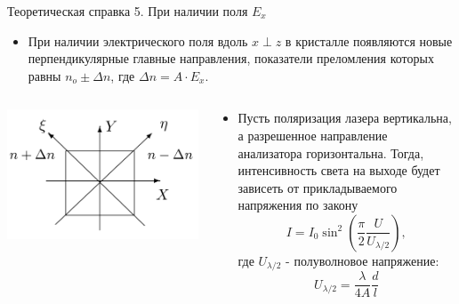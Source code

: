 \documentclass[11pt]{beamer} %
\begin{document}
     \begin{frame}{Теоретическая справка 5. При наличии поля $E_{x}$}
        \small
        \begin{itemize}
            \item При наличии электрического поля вдоль $x \perp z$ в кристалле появляются новые перпендикулярные
            главные направления, показатели преломления которых равны $n_o \pm \Delta n$, где
            $\Delta n = A \cdot E_{x}$.
            \end{itemize}
           

            \begin{columns}[T]
            \begin{column}{0.4\textwidth}
                \centering
                \vspace{7mm}
                \includegraphics[width=1.2\textwidth]{images/pokkels_axes.png}
            \end{column}%
    
            \begin{column}{0.6\textwidth}
                \centering
                \small
                \begin{itemize}
                    \item  Пусть поляризация лазера вертикальна, а разрешенное
            направление анализатора горизонтальна. Тогда, интенсивность света на выходе будет зависеть от прикладываемого напряжения по закону
                    \begin{equation}
                    I = I_0 \sin^2\left(\frac{\pi}{2}\frac{U}{U_{\lambda/2}}\right),
                \end{equation}
                где $U_{\lambda/2}$ - полуволновое напряжение:
                \begin{equation}
                    U_{\lambda/2} = \frac{\lambda}{4A} \frac{d}{l}
                    \label{eq:poluvolnovoe_napryajenie}
                \end{equation}
                \end{itemize}
                
            \end{column}%
    \end{columns}
       

    \end{frame}
    
\end{document}
